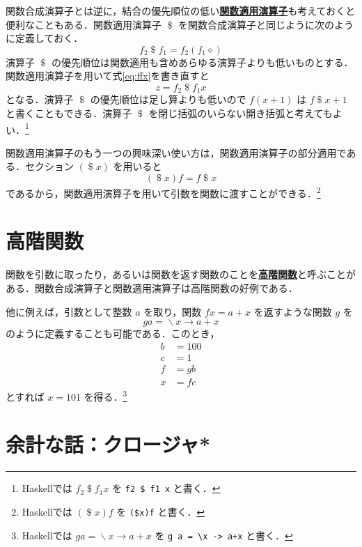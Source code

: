 \documentclass[a4paper,twocolumn]{jsbook}
\newcommand{\programminglanguage}[1]{\textsf{#1}}
\newcommand{\haskell}{\programminglanguage{Haskell}}
\newcommand{\keyword}[1]{{\underline{\textbf{#1}}}}
\newcommand{\code}[1]{\texttt{#1}}
\newcommand{\mAnonParam}{\diamond}
\DeclareMathOperator{\mApply}{\$}
\DeclareMathOperator{\mLambda}{\backslash}
\DeclareMathOperator{\mLambdaArrow}{\rightarrow}
\newcommand{\mLambdaExp}[2]{\mLambda{#1}\mLambdaArrow{#2}}
\begin{document}
関数合成演算子とは逆に，結合の優先順位の低い\keyword{関数適用演算子}も考えておくと便利なこともある．関数適用演算子 $\mApply$ を関数合成演算子と同じように次のように定義しておく．
\begin{equation}
f_2\mApply f_1=f_2\left(f_1\mAnonParam\right)
\end{equation}
演算子 $\mApply$ の優先順位は関数適用も含めあらゆる演算子よりも低いものとする．関数適用演算子を用いて式\eqref{eq:ffx}を書き直すと
\begin{equation}
z=f_2\mApply f_1x
\end{equation}
となる．演算子 $\mApply$ の優先順位は足し算よりも低いので $f(x+1)$ は $f\mApply x+1$ と書くこともできる．演算子 $\mApply$ を閉じ括弧のいらない開き括弧と考えてもよい．\footnote{\haskell では $f_2\mApply f_1x$ を \code{f2 \$ f1 x} と書く．}

関数適用演算子のもう一つの興味深い使い方は，関数適用演算子の部分適用である．セクション $(\mApply x)$ を用いると
\begin{equation}
(\mApply x)f=f\mApply x
\end{equation}
であるから，関数適用演算子を用いて引数を関数に渡すことができる．\footnote{\haskell では $(\mApply x)f$ を \code{(\$x)f} と書く．}

\section{高階関数}

関数を引数に取ったり，あるいは関数を返す関数のことを\keyword{高階関数}と呼ぶことがある．関数合成演算子と関数適用演算子は高階関数の好例である．

他に例えば，引数として整数 $a$ を取り，関数 $fx=a+x$ を返すような関数 $g$ を
\begin{equation}
ga=\mLambdaExp{x}{a+x}
\end{equation}
のように定義することも可能である．このとき，
\begin{align}
b&=100\\
c&=1\\
f&=gb\\
x&=fc
\end{align}
とすれば $x=101$ を得る．\footnote{\haskell では $ga=\mLambdaExp{x}{a+x}$ を \code{g a = \textbackslash x -> a+x} と書く．}

\section{余計な話：クロージャ*}
\end{document}
